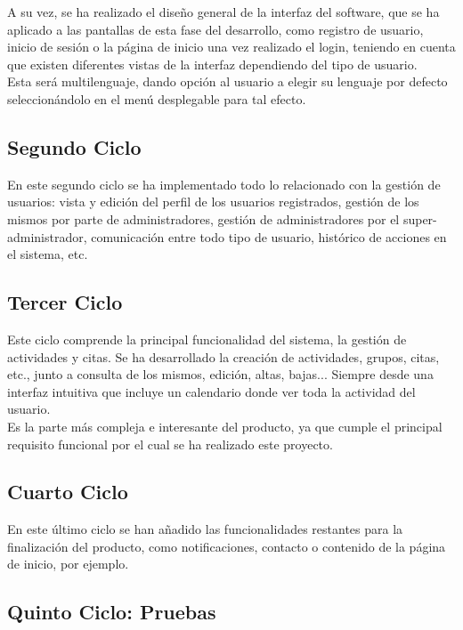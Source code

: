 A su vez, se ha realizado el diseño general de la interfaz del software, que se ha aplicado a las pantallas de esta fase del desarrollo, como registro de usuario, inicio de sesión o la página de inicio una vez realizado el login, teniendo en cuenta que existen diferentes vistas de la interfaz dependiendo del tipo de usuario. \\
Esta será multilenguaje, dando opción al usuario a elegir su lenguaje por defecto seleccionándolo en el menú desplegable para tal efecto.

\subsection{Segundo Ciclo}

En este segundo ciclo se ha implementado todo lo relacionado con la gestión de usuarios: vista y edición del perfil de los usuarios registrados, gestión de los mismos por parte de administradores, gestión de administradores por el super-administrador, comunicación entre todo tipo de usuario, histórico de acciones en el sistema, etc.

\subsection{Tercer Ciclo}

Este ciclo comprende la principal funcionalidad del sistema, la gestión de actividades y citas. Se ha desarrollado la creación de actividades, grupos, citas, etc., junto a consulta de los mismos, edición, altas, bajas... Siempre desde una interfaz intuitiva que incluye un calendario donde ver toda la actividad del usuario. 
\\

Es la parte más compleja e interesante del producto, ya que cumple el principal requisito funcional por el cual se ha realizado este proyecto.

\subsection{Cuarto Ciclo}

En este último ciclo se han añadido las funcionalidades restantes para la finalización del producto, como notificaciones, contacto o contenido de la página de inicio, por ejemplo. 


\subsection{Quinto Ciclo: Pruebas}

